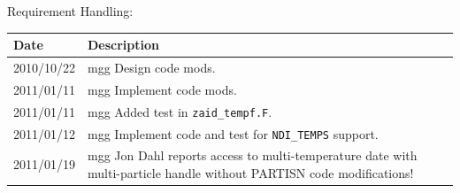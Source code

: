 Requirement Handling:

\begin{tabular}{|p{72pt}|p{351pt}|} \hline
Date & Description \\ \hline
2010/10/22 & mgg Design code mods.\\ \hline
2011/01/11 & mgg Implement code mods. \\ \hline
2011/01/11 & mgg Added test in \texttt{zaid\_tempf.F}. \\ \hline 
2011/01/12 & mgg Implement code and test for \texttt{NDI\_TEMPS}
support. \\ \hline 
2011/01/19 & mgg Jon Dahl reports access to multi-temperature date
with multi-particle handle without PARTISN code modifications! \\ \hline 
\end{tabular}
